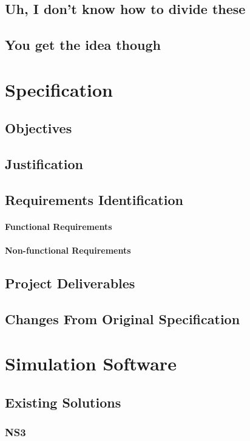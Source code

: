 \documentclass[12pt,a4paper,twoside]{report}
\begin{document}
	\section{Uh, I don't know how to divide these}
	\section{You get the idea though}

\chapter{Specification}
	\section{Objectives}
	\section{Justification}
	\section{Requirements Identification}
			\subsubsection{Functional Requirements}
			\subsubsection{Non-functional Requirements}
	\section{Project Deliverables}
	\section{Changes From Original Specification}
	
\chapter{Simulation Software}
	\section{Existing Solutions}
		\subsection{NS3}
\end{document}
